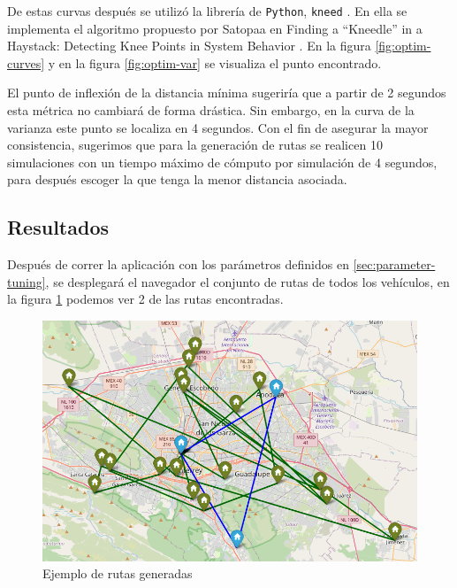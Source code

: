 \documentclass[journal]{IEEEtran}
\begin{document}
            De estas curvas después se utilizó la librería de \texttt{Python}, \texttt{kneed} \cite{kneed}. En ella se implementa el algoritmo propuesto por Satopaa en Finding a “Kneedle” in a Haystack: Detecting Knee Points in System Behavior \cite{satopaa2011finding}. En la figura \ref{fig:optim-curves} y en la figura \ref{fig:optim-var} se visualiza el punto encontrado.

            El punto de inflexión de la distancia mínima sugeriría que a partir de 2 segundos esta métrica no cambiará de forma drástica. Sin embargo, en la curva de la varianza este punto se localiza en 4 segundos. Con el fin de asegurar la mayor consistencia, sugerimos que para la generación de rutas se realicen 10 simulaciones con un tiempo máximo de cómputo por simulación de 4 segundos, para después escoger la que tenga la menor distancia asociada.

        \subsection{Resultados} \label{sec:results}

            Después de correr la aplicación con los parámetros definidos en \ref{sec:parameter-tuning}, se desplegará el navegador el conjunto de rutas de todos los vehículos, en la figura \ref{fig:generated-routes} podemos ver 2 de las rutas encontradas.
        
            \begin{figure}[H]
                \centering
                \includegraphics[scale=0.4]{../img/route-examples.png}
                \caption{Ejemplo de rutas generadas} 
                \label{fig:generated-routes}
            \end{figure}
            
\end{document}
